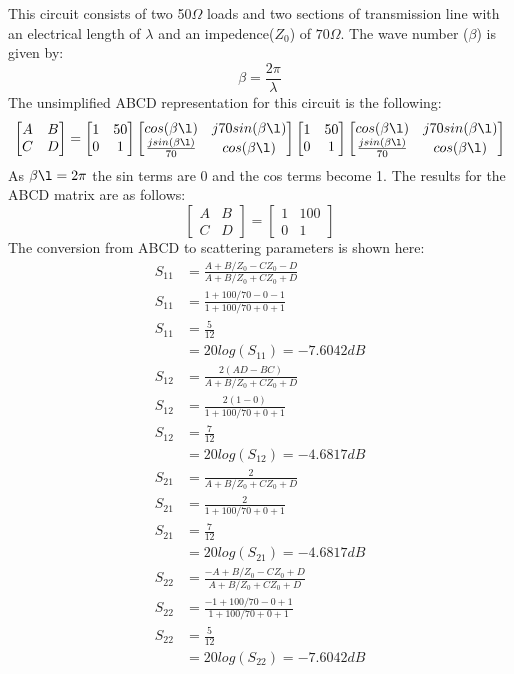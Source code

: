 \documentclass{paper}
\begin{document}
This circuit consists of two 50$\Omega$ loads and two sections of transmission line with an electrical length of $\lambda$ and an impedence($Z_0$) of $70\Omega$. The wave number ($\beta$) is given by:
$$\beta = \frac{2\pi}{\lambda}$$
The unsimplified ABCD representation for this circuit is the following:
$$\begin{bmatrix}
A & B\\
C & D
\end{bmatrix} = 
\begin{bmatrix}
1 & 50\\
0 & 1
\end{bmatrix}
\begin{bmatrix}
cos(\beta\l) & j70sin(\beta\l)\\
\frac{jsin(\beta\l)}{70} & cos(\beta\l)
\end{bmatrix}
\begin{bmatrix}
1 & 50\\
0 & 1
\end{bmatrix}
\begin{bmatrix}
cos(\beta\l) & j70sin(\beta\l)\\
\frac{jsin(\beta\l)}{70} & cos(\beta\l)
\end{bmatrix}
$$
As $\beta\l=2\pi$ the sin terms are 0 and the cos terms become 1. The results for the ABCD matrix are as follows:
$$\begin{bmatrix}
A & B\\
C & D
\end{bmatrix} = 
\begin{bmatrix}
1 & 100\\
0 & 1
\end{bmatrix}
$$
The conversion from ABCD to scattering parameters is shown here:
\begin{align}
S_{11} &=\frac{A+B/Z_0-CZ_0-D}{A+B/Z_0+CZ_0+D}\\
S_{11} &=\frac{1+100/70-0-1}{1+100/70+0+1}\\
S_{11} &=\frac{5}{12}\\
&= 20log(S_{11})= -7.6042dB
\end{align}
\begin{align}
S_{12} &= \frac{2(AD-BC)}{A+B/Z_0+CZ_0+D}\\
S_{12} &= \frac{2(1-0)}{1+100/70+0+1}\\
S_{12} &= \frac{7}{12} \\ 
&= 20log(S_{12})= -4.6817dB
\end{align}
\begin{align}
S_{21} &= \frac{2}{A+B/Z_0+CZ_0+D}\\
S_{21} &= \frac{2}{1+100/70+0+1}\\
S_{21} &= \frac{7}{12} \\
&= 20log(S_{21})= -4.6817dB
\end{align}
\begin{align}
S_{22} &= \frac{-A+B/Z_0-CZ_0+D}{A+B/Z_0 +CZ_0+D}\\
S_{22} &= \frac{-1+100/70-0+1}{1+100/70+0+1}\\
S_{22} &= \frac{5}{12} \\
&= 20log(S_{22})= -7.6042dB
\end{align}
\end{document}
